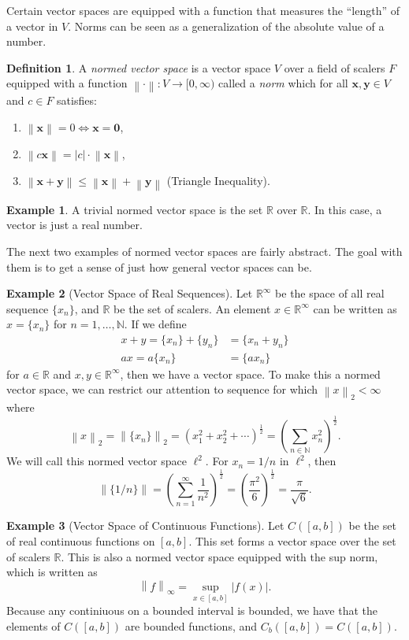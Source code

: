 \documentclass{article}
\newcommand{\N}{\mathbb{N}}
\newcommand{\R}{\mathbb{R}}
\newcommand{\x}{\mathbf{x}}
\newcommand{\y}{\mathbf{y}}
\newcommand{\ze}{\mathbf{0}}
\newcommand{\norm}[1]{\left\lVert#1\right\rVert}
\theoremstyle{definition}
\newtheorem{definition}{Definition}[section]
\newtheorem{example}{Example}[section]
\begin{document}
	Certain vector spaces are equipped with a function that measures the ``length'' of a vector in $ V $. Norms can be seen as a generalization of the absolute value of a number.
	\begin{definition}\label{def8.2}
		A \textit{\color{red}normed vector space} is a vector space $ V $ over a field of scalers $ F $ equipped with a function $\norm{\cdot}:V\to[0,\infty)$ called a \textit{\color{red}norm} which for all $ \x,\y\in V $ and $ c\in F $ satisfies:
		\begin{enumerate}
			\item $ \norm{\x}=0\iff \x=\ze$,
			\item $ \norm{c\x}=|c|\cdot \norm{\x} $,
			\item $ \norm{\x+\y}\le\norm{\x}+\norm{\y} $ (Triangle Inequality).
		\end{enumerate} 
	\end{definition}
	\begin{example}
		A trivial normed vector space is the set $ \R $ over $ \R $. In this case, a vector is just a real number. 
	\end{example}
	The next two examples of normed vector spaces are fairly abstract. The goal with them is to get a sense of just how general vector spaces can be.
	\begin{example}[Vector Space of Real Sequences]
		Let $ \R^\infty $ be the space of all real sequence $ \{x_n\} $, and $ \R $ be the set of scalers. An element $x\in \R^\infty$ can be written as $x=\{x_n\}$ for $n=1,\ldots,\N$.  If we define \begin{align*}
		x + y =	\{x_n\}+\{y_n\}&=\{x_n+y_n\}\\
			ax = a\{x_n\}&=\{ax_n \}
		\end{align*}
		for $ a\in\R $ and $ x,y\in\R^\infty $, then we have a vector space. To make this a normed vector space, we can restrict our attention to sequence for which $ \norm{x}_2<\infty $ where $$ \norm{x}_2 = \norm{\{x_n\}}_2=\left(x_1^2+x_2^2+\cdots\right)^\frac{1}{2}=\left(\sum_{n\in\N}x_n^2\right)^\frac{1}{2}.$$  We will call this normed vector space $ \ell^2 $. For $ x_n=1/n $ in $ \ell^2 $, then $$\norm{\{1/n\}}=\left(\sum_{n=1}^\infty\frac{1}{n^2}\right)^\frac{1}{2}=\left(\frac{\pi^2}{6}\right)^\frac{1}{2}=\frac{\pi}{\sqrt{6}} .$$ 
	\end{example}
	\begin{example}[Vector Space of Continuous Functions]
		Let $ C([a,b]) $ be the set of real continuous functions on $ [a,b] $. This set forms a vector space over the set of scalers $ \R $. This is also a normed vector space equipped with the sup norm, which is written as $$\norm{f}_\infty=\sup_{x\in [a,b]}|f(x)| .$$ Because any continiuous on a bounded interval is bounded, we have that the elements of $C([a,b])$ are bounded functions, and $C_b([a,b])=C([a,b])$.
	\end{example}
\end{document}
